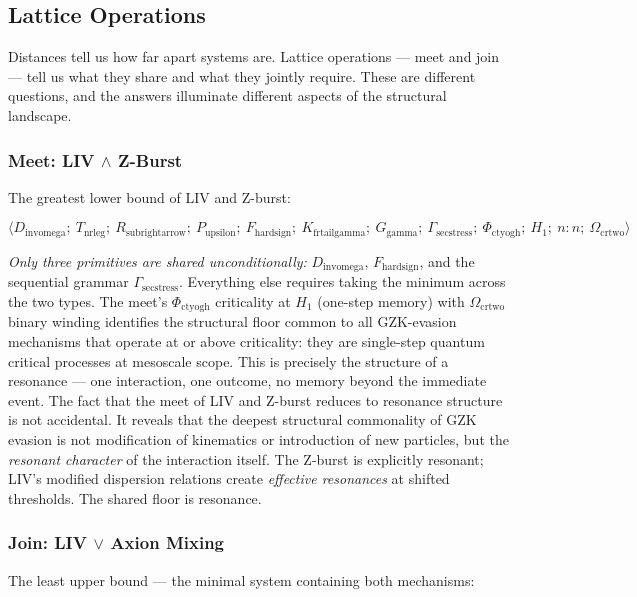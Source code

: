 \documentclass[12pt,a4paper]{article}
\begin{document}
\subsection{Lattice Operations}

Distances tell us how far apart systems are. Lattice operations --- meet and join --- tell us what they share and what they jointly require. These are different questions, and the answers illuminate different aspects of the structural landscape.

\subsubsection{Meet: LIV $\wedge$ Z-Burst}

The greatest lower bound of LIV and Z-burst:


\[\langle D_{\text{invomega}};\ T_{\text{nrleg}};\ R_{\text{subrightarrow}};\ P_{\text{upsilon}};\ F_{\text{hardsign}};\ K_{\text{frtailgamma}};\ G_{\text{gamma}};\ \Gamma_{\text{secstress}};\ \Phi_{\text{ctyogh}};\ H_1;\ n{:}n;\ \Omega_{\text{crtwo}} \rangle\]

\emph{Only three primitives are shared unconditionally:} $D_{\text{invomega}}$, $F_{\text{hardsign}}$, and the sequential grammar $\Gamma_{\text{secstress}}$. Everything else requires taking the minimum across the two types. The meet's $\Phi_{\text{ctyogh}}$ criticality at $H_1$ (one-step memory) with $\Omega_{\text{crtwo}}$ binary winding identifies the structural floor common to all GZK-evasion mechanisms that operate at or above criticality: they are single-step quantum critical processes at mesoscale scope. This is precisely the structure of a resonance --- one interaction, one outcome, no memory beyond the immediate event. The fact that the meet of LIV and Z-burst reduces to resonance structure is not accidental. It reveals that the deepest structural commonality of GZK evasion is not modification of kinematics or introduction of new particles, but the \emph{resonant character} of the interaction itself. The Z-burst is explicitly resonant; LIV's modified dispersion relations create \emph{effective resonances} at shifted thresholds. The shared floor is resonance.

\subsubsection{Join: LIV $\vee$ Axion Mixing}

The least upper bound --- the minimal system containing both mechanisms:
\end{document}
